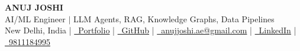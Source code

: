 \begin{center}
    \textbf{\huge ANUJ JOSHI} \\[1pt]
    \small AI/ML Engineer $|$ LLM Agents, RAG, Knowledge Graphs, Data Pipelines \\[3pt]
    \footnotesize New Delhi, India \:|\: \href{https://anujjoshi.site}{\faGlobe\ Portfolio} \:|\: \href{https://github.com/Anujjoshi3105}{\faGithub\ GitHub}
    \:|\: \href{mailto:anujjoshi.ae@gmail.com}{\faEnvelope\ anujjoshi.ae@gmail.com}
    \:|\: \href{https://www.linkedin.com/in/anujjoshi3105/}{\faLinkedin\ LinkedIn}
    \:|\: \href{tel:+919811184995}{\faPhone\ 9811184995}
\end{center}